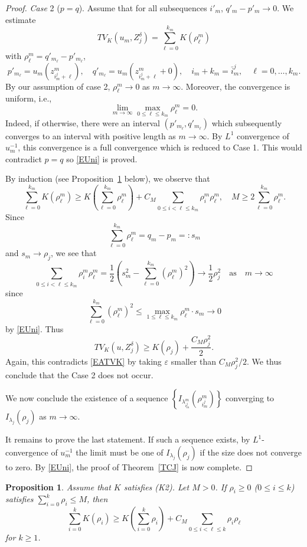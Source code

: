 \documentclass[12pt, reqno]{amsart}
\numberwithin{equation}{section}
\newtheorem{prop}[thm]{Proposition}
\begin{document}
\begin{proof}
\noindent
\emph{Case} 2 ($p=q$).
 Assume that for all subsequences $i'_m$, $q'_m-p'_m\to0$.
 We estimate
\[
    TV_K(u_m, Z_j^\delta)
    = \sum_{\ell=0}^{k_m} K(\rho_\ell^m)
\]
with $\rho_\ell^m=q'_{m_\ell}-p'_{m_\ell}$,
\[
    p'_{m_\ell} = u_m(z_{i_m^j+\ell}^m), \quad
    q'_{m_\ell} = u_m(z_{i_m^j+\ell}^m+0), \quad
    i_m + k_m = \bar{i}_m^j, \quad
    \ell=0,\ldots,k_m.
\]
By our assumption of case 2, $\rho_\ell^m\to0$ as $m\to\infty$.
 Moreover, the convergence is uniform, i.e.,
\begin{equation} \label{EUni}
    \lim_{m\to\infty} \max_{0\le\ell\le k_m} \rho_\ell^m = 0.
\end{equation}
Indeed, if otherwise, there were an interval $(p'_{m_\ell},q'_{m_\ell})$ which subsequently converges to an interval with positive length as $m\to\infty$.
 By $L^1$ convergence of $u_m^{-1}$, this convergence is a full convergence which is reduced to Case 1.
 This would contradict $p=q$ so \eqref{EUni} is proved.

By induction (see Proposition~\ref{PInd} below), we observe that
\[
    \sum_{\ell=0}^{k_m} K(\rho_\ell^m)
    \ge K \left(\sum_{\ell=0}^{k_m} \rho_\ell^m \right)
    + C_M \sum_{0\le i<\ell\le k_m} \rho_i^m \rho_\ell^m, \quad
    M \ge 2\sum_{\ell=0}^{k_m} \rho_\ell^m.
\]
Since
\[
    \sum_{\ell=0}^{k_m} \rho_\ell^m
    = q_m - p_m =: s_m
\]
and $s_m\to\rho_j$, we see that
\[
    \sum_{0\le i<\ell\le k_m} \rho_i^m \rho_\ell^m
    = \frac12 \left( s_m^2 - \sum_{\ell=0}^{k_m} (\rho_\ell^m)^2 \right) \to \frac12 \rho_j^2
    \quad\text{as}\quad m \to \infty
\]
since
\[
    \sum_{\ell=0}^{k_m} (\rho_\ell^m)^2
    \le \max_{1\le\ell\le k_m} \rho_\ell^m \cdot s_m \to 0
\]
by \eqref{EUni}.
 Thus
\[
    TV_K(u,Z_j^\delta) \ge K(\rho_j) + \frac{C_M \rho_j^2}{2}.
\]
Again, this contradicts \eqref{EATVK} by taking $\varepsilon$ smaller than $C_M\rho_j^2/2$.
 We thus conclude that the Case 2 does not occur.

We now conclude the existence of a sequence $\left\{I_{\lambda_{i_m^j}^m}(\rho_{i_m^j}^m)\right\}$ converging to $I_{\lambda_j}(\rho_j)$ as $m\to\infty$.

It remains to prove the last statement.
 If such a sequence exists, by $L^1$-convergence of $u_m^{-1}$ the limit must be one of $I_{\lambda_j}(\rho_j)$ if the size does not converge to zero.
 By \eqref{EUni}, the proof of Theorem~\ref{TCJ} is now complete.
\end{proof}
%
\begin{prop} \label{PInd}
Assume that $K$ satisfies (K2).
 Let $M>0$.
 If $\rho_i\ge0$ ($0\le i \le k$) satisfies $\sum_{i=0}^k\rho_i\le M$, then
\begin{equation} \label{EInd}
    \sum_{i=0}^k K(\rho_i)
    \ge K \left(\sum_{i=0}^k \rho_i \right)
    + C_M \sum_{0\le i<\ell\le k} \rho_i \rho_\ell
\end{equation}
for $k\ge1$.
\end{prop}
\end{document}
